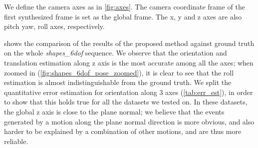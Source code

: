 We define the camera axes as in \cref{fig:axes}. The camera coordinate
frame of the first synthesized frame is set as the global frame. The
x, y and z axes are also pitch yaw, roll axes, respectively.


 shows the comparison of the results of the
proposed method against ground truth on the whole
\textit{shapes\_6dof} sequence. We observe that the orientation and
translation estimation along z axis is the most accurate among all the
axes; when zoomed in (\cref{fig:shapes_6dof_pose_zoomed}), it is clear
to see that the roll estimation is almost indistinguishable from the
ground truth. We split the quantitative error estimation for
orientation along 3 axes (\cref{tab:err_est}), in order to show that
this holds true for all the datasets we tested on. In these datasets,
the global z axis is close to the plane normal; we believe that the
events generated by a motion along the plane normal direction is more
obvious, and also harder to be explained by a combination of other
motions, and are thus more reliable.

